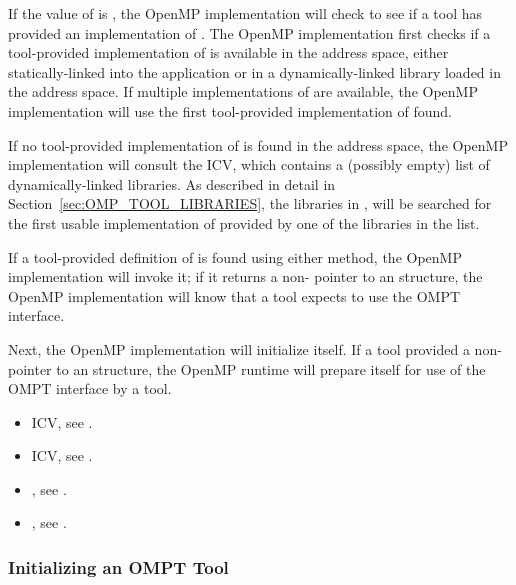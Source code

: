 If the value of  is , the OpenMP
implementation will check to see if a tool has provided an
implementation of .  The OpenMP implementation first
checks if a tool-provided implementation of  is
available in the address space, either statically-linked into the
application or in a dynamically-linked library loaded in the address
space. If multiple implementations of  are available,
the OpenMP implementation will use the first tool-provided
implementation of  found.

If no tool-provided implementation of  is found in
the address space, the OpenMP implementation will consult the
 ICV, which contains a (possibly empty) list
of dynamically-linked libraries.  As described in detail in
Section~\ref{sec:OMP_TOOL_LIBRARIES}, the libraries in
, will be searched for the first usable
implementation of  provided by one of the libraries
in the list.

If a tool-provided definition of  is found using
either method, the OpenMP implementation will invoke it; if it returns
a non- pointer to an  structure,
the OpenMP implementation will know
that a tool expects to use the OMPT interface.

Next, the OpenMP implementation will initialize itself. If a tool
provided a non- pointer to an  structure,
the OpenMP runtime will prepare itself for use of the OMPT interface by a tool. 

\crossreferences
\begin{itemize}
\item {} ICV, see .
\item {} ICV, see .
\item {}, see .
\item {}, see .
\end{itemize}

\subsubsection{Initializing an OMPT Tool}
\label{sec:tool-initialize}

